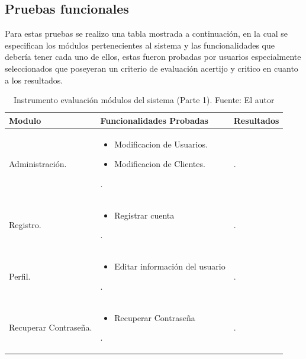 \setlength{\parskip}{0mm}



\subsection{Pruebas funcionales}
\setlength{\parskip}{5mm}


Para estas pruebas se realizo una tabla mostrada a continuación, en la cual se especifican los módulos pertenecientes al sistema y las funcionalidades que debería tener cada uno de ellos, estas fueron probadas por usuarios especialmente seleccionados que poseyeran un criterio de evaluación acertijo y critico en cuanto a los resultados. 
\setlength{\parskip}{0mm}

\begin{table}[H]	
\begin{center}
\begin{tabular}{ | m{4cm} | m{8cm}| m{3cm}| } 
 \hline
 Modulo & Funcionalidades Probadas & Resultados \\
 \hline
 Administración. 
 & 
 \begin{itemize}
 	\item Modificacion de Usuarios.
 	\item Modificacion de Clientes.
 \end{itemize}. 
 & 
 .\\

 \hline
 Registro. 
 & 
 \begin{itemize}
 	\item Registrar cuenta
 \end{itemize}. 
 & 
 .\\

 \hline
 Perfil. 
 & 
 \begin{itemize}
 	\item Editar información del usuario
 \end{itemize}. 
 & 
 .\\

 \hline
 
 Recuperar Contraseña.
 & 
 \begin{itemize}
 	\item Recuperar Contraseña 
 \end{itemize}. 
 & 
 .\\

 \hline

 \end{tabular}
\caption{Instrumento evaluación módulos del sistema (Parte 1). Fuente: El autor}
\label{Tabla:7}
\end{center}
\end{table}	

